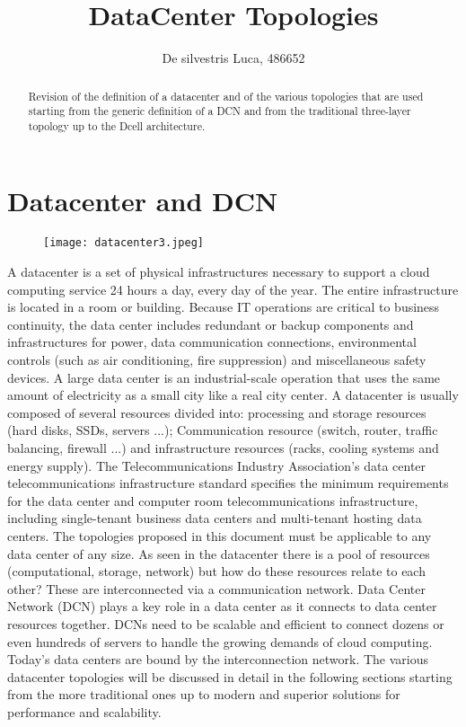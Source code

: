 \documentclass[]{article}
\title{DataCenter Topologies}
\author{De silvestris Luca, 486652}
\begin{document}
\maketitle

\begin{abstract}
	Revision of the definition of a datacenter and of the various topologies that are used starting from the generic definition of a DCN and from the traditional three-layer topology up to the Dcell architecture.
\end{abstract}
\section{Datacenter and DCN}


	\begin{figure}[htbp]
		\centering
		\texttt{[image: datacenter3.jpeg]}

	\end{figure}

A datacenter is a set of physical infrastructures necessary to support a cloud computing service 24 hours a day, every day of the year. The entire infrastructure is located in a room or building. Because IT operations are critical to business continuity, the data center includes redundant or backup components and infrastructures for power, data communication connections, environmental controls (such as air conditioning, fire suppression) and miscellaneous safety devices. A large data center is an industrial-scale operation that uses the same amount of electricity as a small city like a real city center.
A datacenter is usually composed of several resources divided into: processing and storage resources (hard disks, SSDs, servers ...); Communication resource (switch, router, traffic balancing, firewall ...) and infrastructure resources (racks, cooling systems and energy supply). The Telecommunications Industry Association's data center telecommunications infrastructure standard specifies the minimum requirements for the data center and computer room telecommunications infrastructure, including single-tenant business data centers and multi-tenant hosting data centers. The topologies proposed in this document must be applicable to any data center of any size.
As seen in the datacenter there is a pool of resources (computational, storage, network) but how do these resources relate to each other? These are interconnected via a communication network. Data Center Network (DCN) plays a key role in a data center as it connects to data center resources together. DCNs need to be scalable and efficient to connect dozens or even hundreds of servers to handle the growing demands of cloud computing. Today's data centers are bound by the interconnection network.
The various datacenter topologies will be discussed in detail in the following sections starting from the more traditional ones up to modern and superior solutions for performance and scalability.
\end{document}
